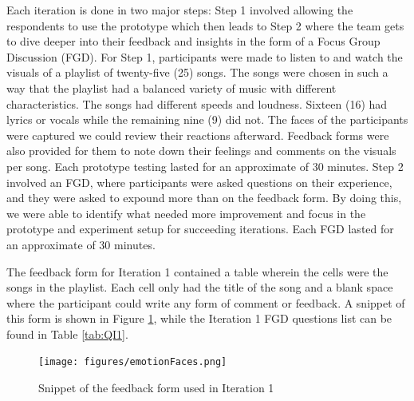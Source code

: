 Each iteration is done in two major steps: Step 1 involved allowing the respondents to use the prototype which then leads to Step 2 where the team gets to dive deeper into their feedback and insights in the form of a Focus Group Discussion (FGD). For Step 1, participants were made to listen to and watch the visuals of a playlist of twenty-five (25) songs. The songs were chosen in such a way that the playlist had a balanced variety of music with different characteristics. The songs had different speeds and loudness. Sixteen (16) had lyrics or vocals while the remaining nine (9) did not. The faces of the participants were captured we could review their reactions afterward. Feedback forms were also provided for them to note down their feelings and comments on the visuals per song. Each prototype testing lasted for an approximate of 30 minutes. Step 2 involved an FGD, where participants were asked questions on their experience, and they were asked to expound more than on the feedback form. By doing this, we were able to identify what needed more improvement and focus in the prototype and experiment setup for succeeding iterations. Each FGD lasted for an approximate of 30 minutes.

The feedback form for Iteration 1 contained a table wherein the cells were the songs in the playlist. Each cell only had the title of the song and a blank space where the participant could write any form of comment or feedback. A snippet of this form is shown in Figure \ref{fig:iter1feedback}, while the Iteration 1 FGD questions list can be found in Table \ref{tab:QI1}.

\begin{figure}[h]
	\centering
	\texttt{[image: figures/emotionFaces.png]}
    \caption{Snippet of the feedback form used in Iteration 1}
    \label{fig:iter1feedback}
\end{figure}

